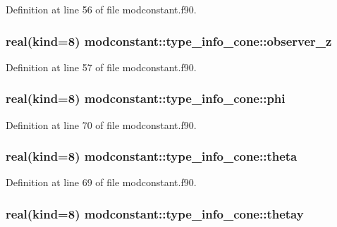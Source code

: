 Definition at line 56 of file modconstant.\-f90.

\hypertarget{structmodconstant_1_1type__info__cone_a7a5d9fc17589735d67e86f25c2375538}{
\subsubsection[{observer\-\_\-z}]{\setlength{\rightskip}{0pt plus 5cm}real(kind=8) modconstant\-::type\-\_\-info\-\_\-cone\-::observer\-\_\-z}}\label{structmodconstant_1_1type__info__cone_a7a5d9fc17589735d67e86f25c2375538}


Definition at line 57 of file modconstant.\-f90.

\hypertarget{structmodconstant_1_1type__info__cone_aea2297db5cf8270053c3553d33b5129c}{
\subsubsection[{phi}]{\setlength{\rightskip}{0pt plus 5cm}real(kind=8) modconstant\-::type\-\_\-info\-\_\-cone\-::phi}}\label{structmodconstant_1_1type__info__cone_aea2297db5cf8270053c3553d33b5129c}


Definition at line 70 of file modconstant.\-f90.

\hypertarget{structmodconstant_1_1type__info__cone_a9f4bf82a93e0d3642eb10f93cc32bb8d}{
\subsubsection[{theta}]{\setlength{\rightskip}{0pt plus 5cm}real(kind=8) modconstant\-::type\-\_\-info\-\_\-cone\-::theta}}\label{structmodconstant_1_1type__info__cone_a9f4bf82a93e0d3642eb10f93cc32bb8d}


Definition at line 69 of file modconstant.\-f90.

\hypertarget{structmodconstant_1_1type__info__cone_a9c21e61bf95ebddb377d4722f5bdaa4a}{
\subsubsection[{thetay}]{\setlength{\rightskip}{0pt plus 5cm}real(kind=8) modconstant\-::type\-\_\-info\-\_\-cone\-::thetay}}\label{structmodconstant_1_1type__info__cone_a9c21e61bf95ebddb377d4722f5bdaa4a}


